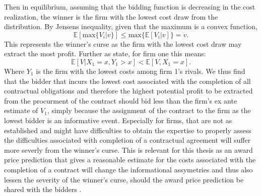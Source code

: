 \documentclass[a4paper,12pt, headsepline]{scrartcl}
\numberwithin{equation}{section}
\begin{document}
 Then in equilibrium, assuming that the bidding function is decreasing in the cost realization, the winner is the firm with the lowest cost draw from the distribution. By Jensens inequality, given that the maximum is a convex function, 
\[
\mathbb{E}[\text{max}\{V_i|v\}] \leq \text{max}\{{\mathbb{E}[V_i|v]}\} = v.
\] 
This represents the winner's curse as the firm with the lowest cost draw may extract the most profit. Further as \citet{milgrom82} state, for firm one this means:
\[
\mathbb{E}[V|X_1 = x, Y_1 > x] < \mathbb{E}[V, X_1 = x].
\]
Where $Y_1$ is the firm with the lowest costs among firm 1's rivals. We thus find that the bidder that incurs the lowest cost associated with the completion of all contractual obligations and therefore the highest potential profit to be extracted from the procurment of the contract should bid less than the firm's ex ante estimate of $V_1$, simply because the assignment of the contract to the firm as the lowest bidder is an informative event. Especially for firms, that are not as established and might have difficulties to obtain the expertise to properly assess the difficulties associated with completion of a contractual agreement will suffer more severly from the winner's curse. This is relevant for this thesis as an award price prediction that gives a reasonable estimate for the costs associated with the completion of a contract will change the informational assymetries and thus also lessen the severity of the winner's curse, should the award price prediction be shared with the bidders \citep{GarciaRodriguez2020}.\\
\end{document}
